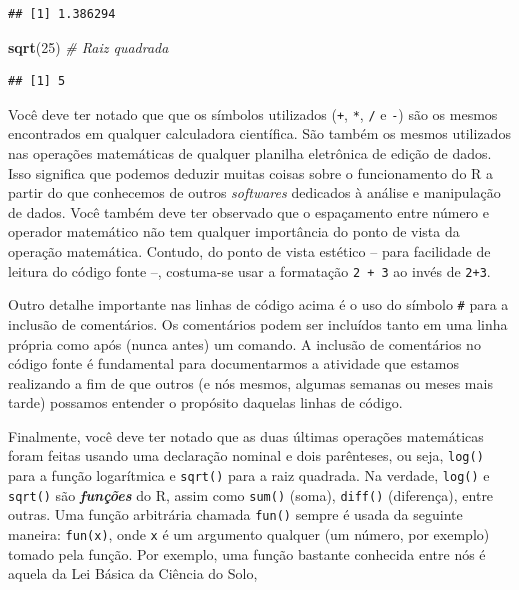 \documentclass[]{book}
\newenvironment{Shaded}{\begin{snugshade}}{\end{snugshade}}
\newcommand{\KeywordTok}[1]{\textcolor[rgb]{0.13,0.29,0.53}{\textbf{{#1}}}}
\newcommand{\DecValTok}[1]{\textcolor[rgb]{0.00,0.00,0.81}{{#1}}}
\newcommand{\CommentTok}[1]{\textcolor[rgb]{0.56,0.35,0.01}{\textit{{#1}}}}
\newcommand{\NormalTok}[1]{{#1}}
\begin{document}
\begin{verbatim}
## [1] 1.386294
\end{verbatim}

\begin{Shaded}
\begin{Highlighting}[]
\KeywordTok{sqrt}\NormalTok{(}\DecValTok{25}\NormalTok{) }\CommentTok{# Raiz quadrada}
\end{Highlighting}
\end{Shaded}

\begin{verbatim}
## [1] 5
\end{verbatim}

Você deve ter notado que que os símbolos utilizados (\texttt{+},
\texttt{*}, \texttt{/} e \texttt{-}) são os mesmos encontrados em
qualquer calculadora científica. São também os mesmos utilizados nas
operações matemáticas de qualquer planilha eletrônica de edição de
dados. Isso significa que podemos deduzir muitas coisas sobre o
funcionamento do R a partir do que conhecemos de outros \emph{softwares}
dedicados à análise e manipulação de dados. Você também deve ter
observado que o espaçamento entre número e operador matemático não tem
qualquer importância do ponto de vista da operação matemática. Contudo,
do ponto de vista estético -- para facilidade de leitura do código fonte
--, costuma-se usar a formatação \texttt{2\ +\ 3} ao invés de
\texttt{2+3}.

Outro detalhe importante nas linhas de código acima é o uso do símbolo
\texttt{\#} para a inclusão de comentários. Os comentários podem ser
incluídos tanto em uma linha própria como após (nunca antes) um comando.
A inclusão de comentários no código fonte é fundamental para
documentarmos a atividade que estamos realizando a fim de que outros (e
nós mesmos, algumas semanas ou meses mais tarde) possamos entender o
propósito daquelas linhas de código.

Finalmente, você deve ter notado que as duas últimas operações
matemáticas foram feitas usando uma declaração nominal e dois
parênteses, ou seja, \texttt{log()} para a função logarítmica e
\texttt{sqrt()} para a raiz quadrada. Na verdade, \texttt{log()} e
\texttt{sqrt()} são \textbf{\emph{funções}} do R, assim como
\texttt{sum()} (soma), \texttt{diff()} (diferença), entre outras. Uma
função arbitrária chamada \texttt{fun()} sempre é usada da seguinte
maneira: \texttt{fun(x)}, onde \texttt{x} é um argumento qualquer (um
número, por exemplo) tomado pela função. Por exemplo, uma função
bastante conhecida entre nós é aquela da Lei Básica da Ciência do Solo,
\end{document}
